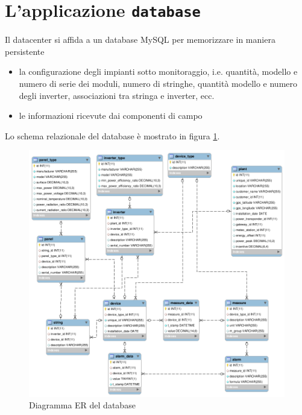 \section{L'applicazione \texttt{database}}
%
Il datacenter si affida a un database MySQL\cite{mysql} per memorizzare in maniera persistente
%
\begin{itemize}
\item la configurazione degli impianti sotto monitoraggio, 
      i.e. quantit\`a, modello e numero di serie dei moduli, numero di stringhe, 
      quantit\`a modello e numero degli inverter, associazioni tra stringa e inverter, ecc.
%
\item le informazioni ricevute dai componenti di campo
\end{itemize}
%
Lo schema relazionale del database \`e mostrato in figura \ref{ermodel}.
%
\begin{figure}[!h]
\centering
\includegraphics[width=400pt]{img/db-er-model.png}
\caption{Diagramma ER del database}
\label{ermodel}
\end{figure}
%

